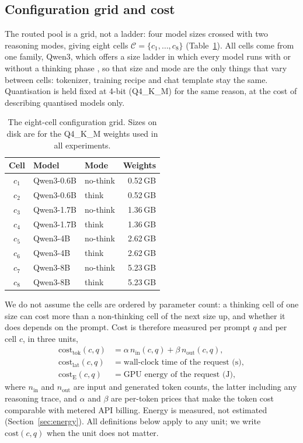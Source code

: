 \documentclass[final,5p,times,twocolumn]{elsarticle}
\theoremstyle{plain}
\newcommand{\cells}{\mathcal{C}}
\newcommand{\cost}{\mathrm{cost}}
\begin{document}
\subsection{Configuration grid and cost}
\label{sec:grid}

The routed pool is a grid, not a ladder: four model sizes crossed with two
reasoning modes, giving eight cells $\cells = \{c_1, \dots, c_8\}$
(Table~\ref{tab:grid}). All cells come from one family, Qwen3, which offers a
size ladder in which every model runs with or without a thinking phase
\cite{qwen3}, so that size and mode are the only things that vary between
cells: tokenizer, training recipe and chat template stay the same.
Quantisation is held fixed at 4-bit (Q4\_K\_M) for the same reason, at the
cost of describing quantised models only.

\begin{table}[ht]
\centering
\caption{The eight-cell configuration grid. Sizes on disk are for the
Q4\_K\_M weights used in all experiments.}
\label{tab:grid}
\begin{tabular}{@{}cllr@{}}
\toprule
Cell & Model & Mode & Weights \\
\midrule
$c_1$ & Qwen3-0.6B & no-think & 0.52\,GB \\
$c_2$ & Qwen3-0.6B & think    & 0.52\,GB \\
$c_3$ & Qwen3-1.7B & no-think & 1.36\,GB \\
$c_4$ & Qwen3-1.7B & think    & 1.36\,GB \\
$c_5$ & Qwen3-4B   & no-think & 2.62\,GB \\
$c_6$ & Qwen3-4B   & think    & 2.62\,GB \\
$c_7$ & Qwen3-8B   & no-think & 5.23\,GB \\
$c_8$ & Qwen3-8B   & think    & 5.23\,GB \\
\bottomrule
\end{tabular}
\end{table}

We do not assume the cells are ordered by parameter count: a thinking cell of
one size can cost more than a non-thinking cell of the next size up, and
whether it does depends on the prompt. Cost is therefore measured per prompt
$q$ and per cell $c$, in three units,
\begin{align}
  \cost_{\mathrm{tok}}(c, q) &= \alpha\, n_{\mathrm{in}}(c, q)
                              + \beta\, n_{\mathrm{out}}(c, q),
  \label{eq:tokcost}\\
  \cost_{\mathrm{lat}}(c, q) &= \text{wall-clock time of the request (s)},
  \label{eq:latcost}\\
  \cost_{\mathrm{E}}(c, q)   &= \text{GPU energy of the request (J)},
  \label{eq:energycost}
\end{align}
where $n_{\mathrm{in}}$ and $n_{\mathrm{out}}$ are input and generated token
counts, the latter including any reasoning trace, and $\alpha$ and $\beta$
are per-token prices that make the token cost comparable with metered API
billing. Energy is measured, not estimated (Section~\ref{sec:energy}). All
definitions below apply to any unit; we write $\cost(c, q)$ when the unit
does not matter.
\end{document}
